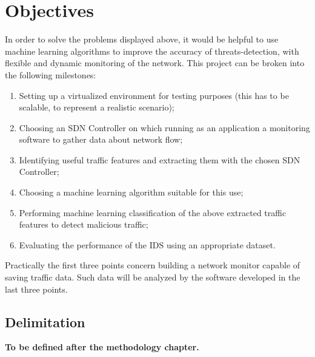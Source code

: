 
\section{Objectives}
\label{sec:objectives}

In order to solve the problems displayed above, it would be helpful to use machine learning algorithms to improve the accuracy of threats-detection, with flexible and dynamic monitoring of the network. This project can be broken into the following milestones:

\begin{enumerate}
    \item Setting up a virtualized environment for testing purposes (this has to be scalable, to represent a realistic scenario);
    \item Choosing an SDN Controller on which running as an application a monitoring software to gather data about network flow;
    \item Identifying useful traffic features and extracting them with the chosen SDN Controller;
    \item Choosing a machine learning algorithm suitable for this use;
    \item Performing machine learning classification of the above extracted traffic features to detect malicious traffic;
    \item Evaluating the performance of the IDS using an appropriate dataset.
\end{enumerate}
Practically the first three points concern building a network monitor capable of saving traffic data. Such data will be analyzed by the software developed in the last three points.


\subsection{Delimitation}
\label{subsec:delimitation}

\faEdit \quad \textbf{To be defined after the methodology chapter.} \\

\lipsum[1-2]

